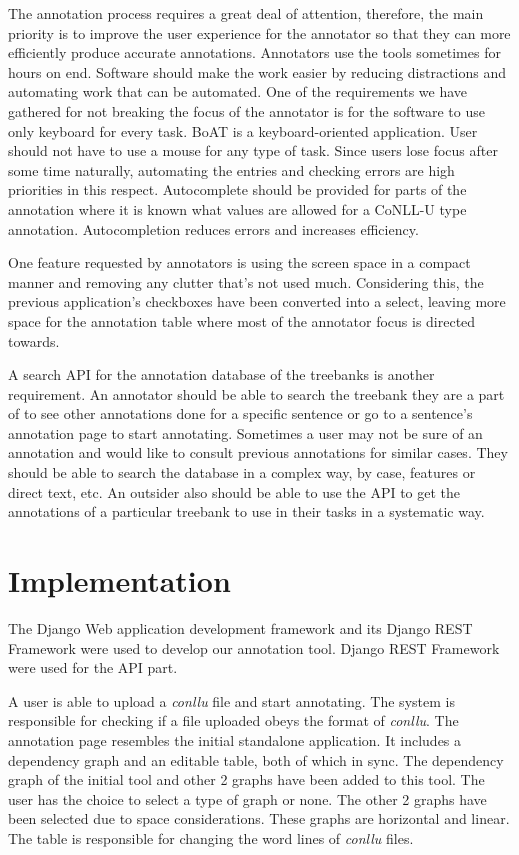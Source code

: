 \documentclass[
]{ceurart}
\begin{document}
The annotation process requires a great deal of attention, therefore, the main priority is to improve the user experience for the annotator so that they can more efficiently produce accurate annotations.
Annotators use the tools sometimes for hours on end.
Software should make the work easier by reducing distractions and automating work that can be automated.
One of the requirements we have gathered for not breaking the focus of the annotator is for the software to use only keyboard for every task.
BoAT is a keyboard-oriented application.
User should not have to use a mouse for any type of task.
Since users lose focus after some time naturally, automating the entries and checking errors are high priorities in this respect.
Autocomplete should be provided for parts of the annotation where it is known what values are allowed for a CoNLL-U type annotation.
Autocompletion reduces errors and increases efficiency.

One feature requested by annotators is using the screen space in a compact manner and removing any clutter that's not used much.
Considering this, the previous application's checkboxes have been converted into a select, leaving more space for the annotation table where most of the annotator focus is directed towards.

A search API for the annotation database of the treebanks is another requirement.
An annotator should be able to search the treebank they are a part of to see other annotations done for a specific sentence or go to a sentence's annotation page to start annotating.
Sometimes a user may not be sure of an annotation and would like to consult previous annotations for similar cases.
They should be able to search the database in a complex way, by case, features or direct text, etc.
An outsider also should be able to use the API to get the annotations of a particular treebank to use in their tasks in a systematic way.

\section{Implementation}
\label{sec:implementation}

The Django\cite{django} Web application development framework and its Django REST Framework\cite{drf} were used to develop our annotation tool.
Django REST Framework were used for the API part.

A user is able to upload a \textit{conllu} file and start annotating.
The system is responsible for checking if a file uploaded obeys the format of \textit{conllu}.
The annotation page resembles the initial standalone application.
It includes a dependency graph and an editable table, both of which in sync.
The dependency graph of the initial tool and other 2 graphs have been added to this tool.
The user has the choice to select a type of graph or none.
The other 2 graphs have been selected due to space considerations.
These graphs are horizontal and linear.
The table is responsible for changing the word lines of \textit{conllu} files.
\end{document}
